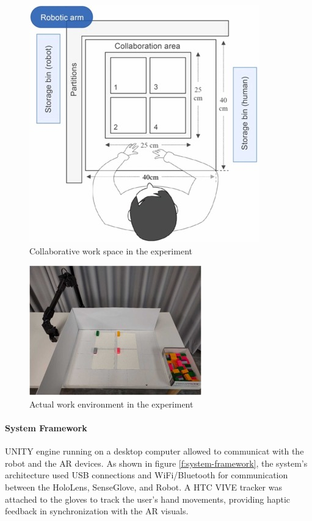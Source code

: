     \begin{figure}[!htpb]
        \centering
        \includegraphics[width=0.4\linewidth]{figs/area-1.jpg}
        \caption{Collaborative work space in the experiment \cite{CHU2023313}}
        \label{f:area-1}
    \end{figure}

    \begin{figure}[!htpb]
        \centering
        \includegraphics[width=0.4\linewidth]{figs/robot-area-1.jpg}
        \caption{Actual work environment in the experiment \cite{CHU2023313}}
        \label{f:robot-area-1}
    \end{figure}

    \paragraph{\textbf{System Framework}}
    UNITY engine running on a desktop computer allowed to communicat with the robot and the \ac{AR} devices. As shown in figure \ref{f:system-framework}, the system's architecture used USB connections and WiFi/Bluetooth for communication between the HoloLens, SenseGlove, and Robot. A HTC VIVE tracker was attached to the gloves to track the user's hand movements, providing haptic feedback in synchronization with the \ac{AR} visuals.



